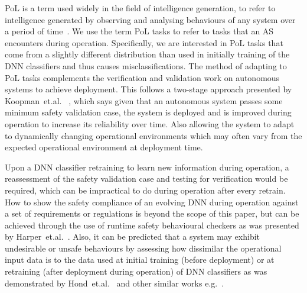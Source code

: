 %
PoL is a term used widely in the field of intelligence generation, to refer to intelligence generated by observing and analysing behaviours of any system over a period of time~\cite{Craddock2016}. 
%
We use the term PoL tasks to refer to tasks that an AS encounters during operation. 
%
Specifically, we are interested in PoL tasks that come from a slightly different distribution than used in initially training of the DNN classifiers and thus causes misclassifications.  
%
The method of adapting to PoL tasks complements the verification and validation work on autonomous systems to achieve deployment. 
%
This follows a two-stage approach presented by Koopman~et.al.~\cite{Koopman2020} , which says given that an autonomous system passes some minimum safety validation case, the system is deployed and is improved during operation to increase its reliability over time. 
%
Also allowing the system to adapt to dynamically changing operational environments which may often vary from the expected operational environment at deployment time.

Upon a DNN classifier retraining to learn new information during operation, a reassessment of the safety validation case and testing for verification would be required, which can be impractical to do during operation after every retrain.  
%
How to show the safety compliance of an evolving DNN during operation against a set of requirements or regulations is beyond the scope of this paper, but can be achieved through the use of runtime safety behavioural checkers as was presented by Harper~et.al.~\cite{harper2021safety}. 
%
Also, it can be predicted that a system may exhibit undesirable or unsafe behaviours by assessing how dissimilar the operational input data is to the data used at initial training (before deployment) or at retraining (after deployment during operation) of DNN classifiers as was demonstrated by\textbf{} Hond~et.al.~\cite{Hond2020} and other similar works e.g.~\cite{Schaffer2017, Mandelbaum2017, Xing2019}. 

